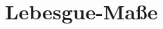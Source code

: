 \documentclass[11pt,twoside]{memoir}
\begin{document}
	
\frontmatter
\maketitle
\tableofcontents

\mainmatter
\chapter{Lebesgue-Maße}
\backmatter
\printindex
\end{document}
